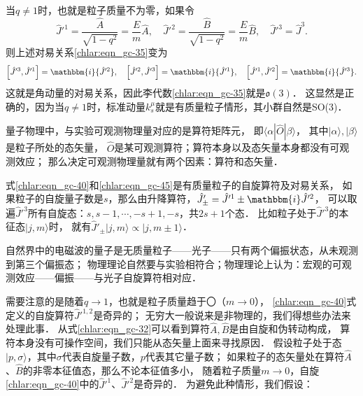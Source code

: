 当$q\neq 1$时，也就是粒子质量不为零，如果令
\begin{equation}\label{chlar:eqn_gc-40}
	{\hat{J}'^1} = \frac{\hat{A}}{{\sqrt {1 - {q^2}} }} = \frac{E}{m}\hat{A},\quad
	{\hat{J}'^2} = \frac{\hat{B}}{{\sqrt {1 - {q^2}} }} = \frac{E}{m}\hat{B},\quad
	{\hat{J}'^3} = \hat{J}^3.
\end{equation}
则上述对易关系\eqref{chlar:eqn_gc-35}变为
\begin{equation}\label{chlar:eqn_gc-45}
	\left[ \hat{J}'^3,\hat{J}'^1 \right] = \mathbbm{i}{\hat{J}'^2},\quad
	\left[ \hat{J}'^2,\hat{J}'^3 \right] = \mathbbm{i}{\hat{J}'^1},\quad
	\left[ \hat{J}'^1,\hat{J}'^2 \right] = \mathbbm{i}{\hat{J}'^3}.
\end{equation}
这就是角动量的对易关系，因此李代数\eqref{chlar:eqn_gc-35}就是$\mathfrak{o}(3)$．
这显然是正确的，因为当$q\neq 1$时，标准动量$k^\mu_s$就是有质量粒子情形，其小群自然是SO(3)．



量子物理中，与实验可观测物理量对应的是算符矩阵元，
即$\langle \alpha | \hat{O}|\beta\rangle$，
其中$|\alpha\rangle,|\beta\rangle$是粒子所处的态矢量，
$\hat{O}$是某可观测算符；算符本身以及态矢量本身都没有可观测效应；
那么决定可观测物理量就有两个因素：{\kaishu 算符和态矢量}．


式\eqref{chlar:eqn_gc-40}和\eqref{chlar:eqn_gc-45}是有质量粒子的自旋算符及对易关系，
如果粒子的自旋量子数是$s$，那么由升降算符，$\hat{J}' _{\pm}=\hat{J}'^1 \pm \mathbbm{i}\hat{J}'^2$，
可以取遍$\hat{J}'^3$所有自旋态：$s,s-1,\cdots,-s+1,-s$，共$2s+1$个态．
比如粒子处于$\hat{J}'^3$的本征态$|j,m\rangle$时，
就有$\hat{J}'_{\pm}|j,m\rangle \propto |j,m\pm 1\rangle$．

自然界中的电磁波的量子是无质量粒子——光子——只有两个偏振状态，从未观测到第三个偏振态；
物理理论自然要与实验相符合；物理理论上认为：宏观的可观测效应——偏振——与光子自旋算符相对应．



需要注意的是随着$q\to 1$，也就是粒子质量趋于〇（$m \to 0$），
\eqref{chlar:eqn_gc-40}式定义的自旋算符$\hat{J}'^{1,2}$是奇异的；
无穷大一般说来是非物理的，我们得想些办法来处理此事．
从式\eqref{chlar:eqn_gc-32}可以看到算符$\hat{A},\hat{B}$是由自旋和伪转动构成，
算符本身没有可操作空间，我们只能从态矢量上面来寻找原因．
假设粒子处于态$|p,\sigma\rangle$，其中$\sigma$代表自旋量子数，$p$代表其它量子数；
如果粒子的态矢量处在算符$\hat{A}$、$\hat{B}$的非零本征值态，那么不论本征值多小，
随着粒子质量$m\to 0$，自旋\eqref{chlar:eqn_gc-40}中的$\hat{J}'^{1}$、$\hat{J}'^{2}$是奇异的．
为避免此种情形，我们假设：

